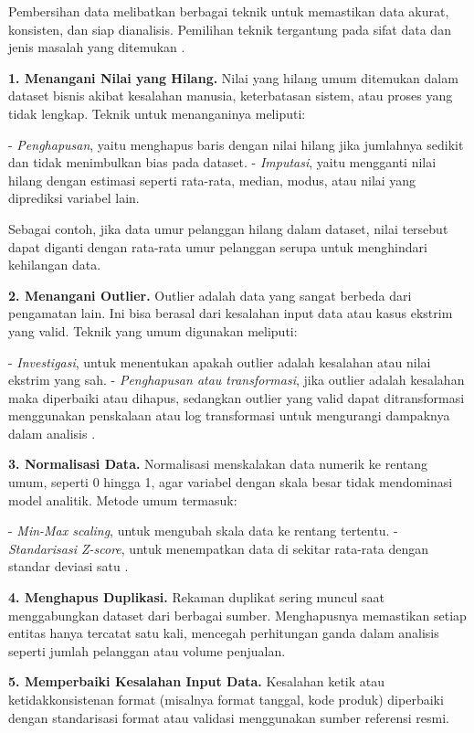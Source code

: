 Pembersihan data melibatkan berbagai teknik untuk memastikan data akurat, konsisten, dan siap dianalisis. Pemilihan teknik tergantung pada sifat data dan jenis masalah yang ditemukan \cite{rahm2000data}.

\textbf{1. Menangani Nilai yang Hilang.}  
Nilai yang hilang umum ditemukan dalam dataset bisnis akibat kesalahan manusia, keterbatasan sistem, atau proses yang tidak lengkap. Teknik untuk menanganinya meliputi:

- \emph{Penghapusan}, yaitu menghapus baris dengan nilai hilang jika jumlahnya sedikit dan tidak menimbulkan bias pada dataset.
- \emph{Imputasi}, yaitu mengganti nilai hilang dengan estimasi seperti rata-rata, median, modus, atau nilai yang diprediksi variabel lain.

Sebagai contoh, jika data umur pelanggan hilang dalam dataset, nilai tersebut dapat diganti dengan rata-rata umur pelanggan serupa untuk menghindari kehilangan data.

\textbf{2. Menangani Outlier.}  
Outlier adalah data yang sangat berbeda dari pengamatan lain. Ini bisa berasal dari kesalahan input data atau kasus ekstrim yang valid. Teknik yang umum digunakan meliputi:

- \emph{Investigasi}, untuk menentukan apakah outlier adalah kesalahan atau nilai ekstrim yang sah.
- \emph{Penghapusan atau transformasi}, jika outlier adalah kesalahan maka diperbaiki atau dihapus, sedangkan outlier yang valid dapat ditransformasi menggunakan penskalaan atau log transformasi untuk mengurangi dampaknya dalam analisis \cite{barnett1994outliers}.

\textbf{3. Normalisasi Data.}  
Normalisasi menskalakan data numerik ke rentang umum, seperti 0 hingga 1, agar variabel dengan skala besar tidak mendominasi model analitik. Metode umum termasuk:

- \emph{Min-Max scaling}, untuk mengubah skala data ke rentang tertentu.
- \emph{Standarisasi Z-score}, untuk menempatkan data di sekitar rata-rata dengan standar deviasi satu \cite{jain2005score}.

\textbf{4. Menghapus Duplikasi.}  
Rekaman duplikat sering muncul saat menggabungkan dataset dari berbagai sumber. Menghapusnya memastikan setiap entitas hanya tercatat satu kali, mencegah perhitungan ganda dalam analisis seperti jumlah pelanggan atau volume penjualan.

\textbf{5. Memperbaiki Kesalahan Input Data.}  
Kesalahan ketik atau ketidakkonsistenan format (misalnya format tanggal, kode produk) diperbaiki dengan standarisasi format atau validasi menggunakan sumber referensi resmi.

